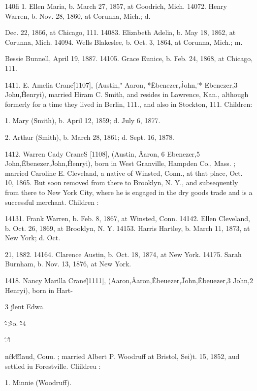 140fi 1. Ellen Maria, b. March 27, 1857, at Goodrich, Mich. 
14072. Henry Warren, b. Nov. 28, 1860, at Corunna, Mich.; d. 

Dec. 22, 1866, at Chicago, 111. 
14083. Elizabeth Adelia, b. May 18, 1862, at Corunna, Mich. 
14094. Wells Blakeslee, b. Oct. 3, 1864, at Corunna, Mich.; m. 

Bessie Bunnell, April 19, 1887. 
14105. Grace Eunice, b. Feb. 24, 1868, at Chicago, 111. 

1411. E. Amelia Crane\^ [1107], (Austin," Aaron, *\^Ebenezer,\^ 
John,'* Ebenezer,3 Johu,\^ Henryi), married Hiram C. Smith, and 
resides in Lawrence, Kan., although formerly for a time they lived 
in Berlin, 111., and also in Stockton, 111. Children: 

1. Mary (Smith), b. April 12, 1859; d. July 6, 1877. 

2. Arthur (Smith), b. March 28, 1861; d. Sept. 16, 1878. 

1412. Warren Cady CraneS [1108], (Austin, \^ Aaron, 6 
Ebenezer,5 John,\^ Ebenezer,\^ John,\^ Henryi), born in West 
Granville, Hampden Co., Mass. ; married Caroline E. Cleveland, 
a native of Winsted, Conn., at that place, Oct. 10, 1865. But 
soon removed from there to Brooklyn, N. Y., and subsequently 
from there to New York City, where he is engaged in the dry 
goods trade and is a successful merchant. Children : 

14131. Frank Warren, b. Feb. 8, 1867, at Winsted, Conn. 
14142. Ellen Cleveland, b. Oct. 26, 1869, at Brooklyn, N. Y. 
14153. Harris Hartley, b. March 11, 1873, at New York; d. Oct. 

21, 1882. 
14164. Clarence Austin, b. Oct. 18, 1874, at New York. 
14175. Sarah Burnham, b. Nov. 13, 1876, at New York. 

1418. Nancy Marilla Crane\^ [1111], (Aaron,\^ Aaron,\^ 
Ebeuezer,\^ John,\^ Ebeuezer,3 John,2 Henryi), born in Hart- 




3 j\^lent Edwa 



\^\^-\^\^\^>o. \^\^\^\^\^-4 



\^.\^4 



n\^ck\^t\^\^\^i\^ 




laud, Couu. ; married Albert P. Woodruff at Bristol, Sei)t. 15, 
1852, aud settled iu Forestville. Cliildreu : 

1. Minnie (Woodruff). 

